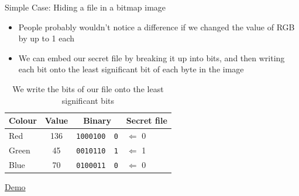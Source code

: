 \documentclass{beamer}
\begin{document}
\begin{frame}{Simple Case: Hiding a file in a bitmap image}

\begin{itemize}
\item People probably wouldn't notice a difference if we changed the value of RGB by up to 1 each
\item We can embed our secret file by breaking it up into bits, and then writing each bit onto the least significant bit of each byte in the image
\end{itemize}

\begin{table}
\centering
\begin{tabular}{l|c|c|l}
Colour & Value & Binary & Secret file\\
\hline
Red & 136 & \texttt{1000100 {\color{red} 0}} & $\Leftarrow$ 0\\
Green & 45 & \texttt{0010110 {\color{red} 1}}& $\Leftarrow$ 1\\
Blue & 70 & \texttt{0100011 {\color{red} 0}} & $\Leftarrow$ 0\\
\end{tabular}
\caption{We write the bits of our file onto the least significant bits}
\end{table}

{\quad \Large \href{run:./steg.js}{Demo}}

\end{frame}
\end{document}
